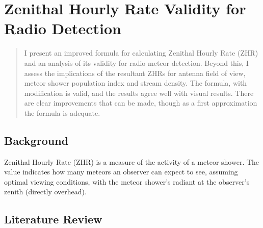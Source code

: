 \chapter{Zenithal Hourly Rate Validity for Radio Detection}
\label{chap:zhr}
\begin{strip}
	\begin{minipage}{\textwidth}
		\begin{abstract}
			I present an improved formula for calculating Zenithal Hourly Rate (ZHR) and an analysis of its validity for radio meteor detection. Beyond this, I assess the implications of the resultant ZHRs for antenna field of view, meteor shower population index and stream density. The formula, with modification is valid, and the results agree well with visual results. There are clear improvements that can be made, though as a first approximation the formula is 	adequate.
		\end{abstract}
	\end{minipage}
\end{strip}
\section{Background}
Zenithal Hourly Rate (ZHR) is a measure of the activity of a meteor shower. The value indicates how many meteors an observer can expect to see, assuming optimal viewing conditions, with the meteor shower's radiant at the observer's zenith (directly overhead).
\section{Literature Review}
